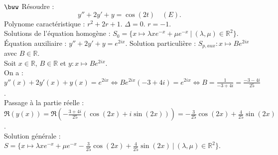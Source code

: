 \documentclass[11pt]{article}
\begin{document}
\begin{exercice}{$\bww$}{}
    Résoudre :
    \begin{equation*}
        y'' + 2y' + y = \cos(2t) \quad (E).
    \end{equation*}
    \tcblower
    Polynome caractéristique : $r^2 + 2r + 1$. $\Delta = 0$. $r = -1$.\\
    Solutions de l'équation homogène : $S_0 = \{x \mapsto \lambda x e^{-x} + \mu e ^{-x} ~ | ~ (\lambda, \mu) \in \mathbb{R}^2\}$.\\
    Équation auxiliaire : $y'' + 2y' + y = e^{2ix}$. Solution particulière : $S_{p,aux} : x\mapsto Be^{2ix}$ avec $B\in\mathbb{R}$.\\
    Soit $x\in\mathbb{R}$, $B\in\mathbb{R}$ et $y:x\mapsto Be^{2ix}$.\\
    On a : $y''(x) + 2y'(x) + y(x) = e^{2ix} \iff Be^{2ix}(-3+4i)= e^{2ix} \iff B = \frac{1}{-3+4i} = \frac{-3-4i}{25}$.\\
    Passage à la partie réelle : $\Re(y(x)) = \Re\left( -\frac{3+4i}{25}\left( \cos(2x) + i\sin(2x) \right) \right) = -\frac{3}{25}\cos(2x) + \frac{4}{25}\sin(2x)$.\\
    Solution générale : $S = \{x \mapsto \lambda x e^{-x} + \mu e^{-x} - \frac{3}{25}\cos(2x) + \frac{4}{25}\sin(2x) ~ | ~ (\lambda, \mu) \in \mathbb{R}^2\}$.
\end{exercice}
\end{document}
